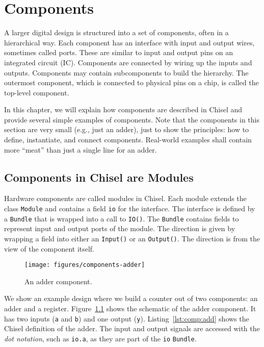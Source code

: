 \documentclass[%
    10pt,
    headinclude, footexclude,
    openright, %
    notitlepage,
    cleardoubleempty,
    headsepline,
    pointlessnumbers,
    bibtotoc, idxtotoc,
    ]{scrbook}
\newcommand{\scale}{0.7}
\newcommand{\code}[1]{{\lstinline[basicstyle=\small\ttfamily]{#1}}}
\begin{document}
\chapter{Components}


A larger digital design is structured into a set of components, often in
a hierarchical way. Each component has an interface with input and output
wires, sometimes called ports. These are similar to input and output pins on an integrated circuit (IC).
Components are connected by wiring up the inputs and outputs.
Components may contain subcomponents to build the hierarchy.
The outermost component, which is connected to physical pins
on a chip, is called the top-level component.

In this chapter, we will explain how components are described in Chisel and
provide several simple examples of components.
Note that the components in this section are very small (e.g., just an adder),
just to show the principles: how to define, instantiate, and connect components.
Real-world examples shall contain more ``meat'' than just a single line for
an adder.

\section{Components in Chisel are Modules}


Hardware components are called modules in Chisel. Each module extends
the class \code{Module} and contains a field \code{io} for the interface.
The interface is defined by a \code{Bundle} that is wrapped into a call to \code{IO()}.
The \code{Bundle} contains fields to represent input and output ports of
the module. The direction is given by wrapping a field into either an \code{Input()}
or an \code{Output()}. The direction is from the view of the component itself.


\begin{figure}
  \centering
  \texttt{[image: figures/components-adder]}
  \caption{An adder component.}
  \label{fig:components-adder}
\end{figure}


We show an example design where we build a counter out of two components:
an adder and a register.
Figure~\ref{fig:components-adder} shows the schematic of the adder component.
It has two inputs (\code{a} and \code{b}) and one output (\code{y}).
Listing~\ref{lst:comp:add} shows the Chisel definition of the adder.
The input and output signals are accessed with
the \emph{dot notation}, such as \code{io.a}, as they are part of the \code{io}
\code{Bundle}.
\end{document}
